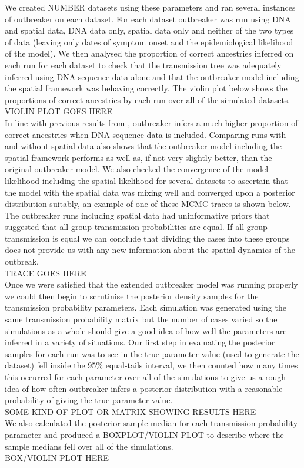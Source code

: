 \documentclass[11pt,a4paper]{report}
\begin{document}
We created NUMBER datasets using these parameters and ran several instances of outbreaker on each dataset. For each dataset outbreaker was run using DNA and spatial data, DNA data only, spatial data only and neither of the two types of data (leaving only dates of symptom onset and the epidemiological likelihood of the model). We then analysed the proportion of correct ancestries inferred on each run for each dataset to check that the transmission tree was adequately inferred using DNA sequence data alone and that the outbreaker model including the spatial framework was behaving correctly. The violin plot below shows the proportions of correct ancestries by each run over all of the simulated datasets. 
\\
VIOLIN PLOT GOES HERE
\\
In line with previous results from \citet{outbrkr}, outbreaker infers a much higher proportion of correct ancestries when DNA sequence data is included. Comparing runs with and without spatial data also shows that the outbreaker model including the spatial framework performs as well as, if not very slightly better, than the original outbreaker model. We also checked the convergence of the model likelihood including the spatial likelihood for several datasets to ascertain that the model with the spatial data was mixing well and converged upon a posterior distribution suitably, an example of one of these MCMC traces is shown below. The outbreaker runs including spatial data had uninformative priors that suggested that all group transmission probabilities are equal. If all group transmission is equal we can conclude that dividing the cases into these groups does not provide us with any new information about the spatial dynamics of the outbreak. 
\\
TRACE GOES HERE
\\
Once we were satisfied that the extended outbreaker model was running properly we could then begin to scrutinise the posterior density samples for the transmission probability parameters. Each simulation was generated using the same transmission probability matrix but the number of cases varied so the simulations as a whole should give a good idea of how well the parameters are inferred in a variety of situations. Our first step in evaluating the posterior samples for each run was to see in the true parameter value (used to generate the dataset) fell inside the 95\% equal-tails interval, we then counted how many times this occurred for each parameter over all of the simulations to give us a rough idea of how often outbreaker infers a posterior distribution with a reasonable probability of giving the true parameter value.
\\
SOME KIND OF PLOT OR MATRIX SHOWING RESULTS HERE
\\
We also calculated the posterior sample median for each transmission probability parameter and produced a BOXPLOT/VIOLIN PLOT to describe where the sample medians fell over all of the simulations.
\\
BOX/VIOLIN PLOT HERE
\\
\end{document}
